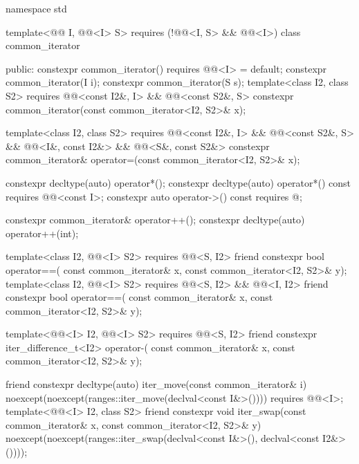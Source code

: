 %
\begin{codeblock}
namespace std {
  template<@@ I, @@<I> S>
    requires (!@@<I, S> && @@<I>)
  class common_iterator {
  public:
    constexpr common_iterator() requires @@<I> = default;
    constexpr common_iterator(I i);
    constexpr common_iterator(S s);
    template<class I2, class S2>
      requires @@<const I2&, I> && @@<const S2&, S>
        constexpr common_iterator(const common_iterator<I2, S2>& x);

    template<class I2, class S2>
      requires @@<const I2&, I> && @@<const S2&, S> &&
               @@<I&, const I2&> && @@<S&, const S2&>
        constexpr common_iterator& operator=(const common_iterator<I2, S2>& x);

    constexpr decltype(auto) operator*();
    constexpr decltype(auto) operator*() const
      requires @@<const I>;
    constexpr auto operator->() const
      requires @\seebelow@;

    constexpr common_iterator& operator++();
    constexpr decltype(auto) operator++(int);

    template<class I2, @@<I> S2>
      requires @@<S, I2>
    friend constexpr bool operator==(
      const common_iterator& x, const common_iterator<I2, S2>& y);
    template<class I2, @@<I> S2>
      requires @@<S, I2> && @@<I, I2>
    friend constexpr bool operator==(
      const common_iterator& x, const common_iterator<I2, S2>& y);

    template<@@<I> I2, @@<I> S2>
      requires @@<S, I2>
    friend constexpr iter_difference_t<I2> operator-(
      const common_iterator& x, const common_iterator<I2, S2>& y);

    friend constexpr decltype(auto) iter_move(const common_iterator& i)
      noexcept(noexcept(ranges::iter_move(declval<const I&>())))
        requires @@<I>;
    template<@@<I> I2, class S2>
      friend constexpr void iter_swap(const common_iterator& x, const common_iterator<I2, S2>& y)
        noexcept(noexcept(ranges::iter_swap(declval<const I&>(), declval<const I2&>())));

}}
\end{codeblock}
